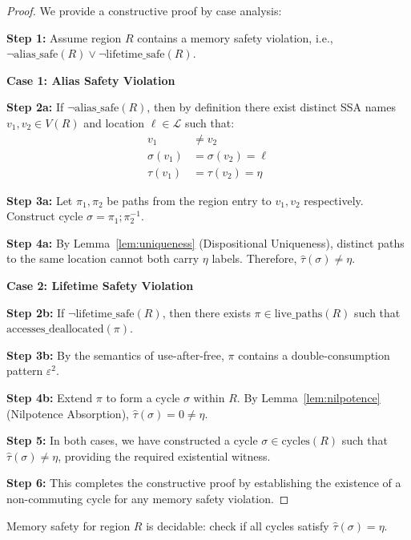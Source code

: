\documentclass[journal]{IEEEtran}
\begin{document}
\begin{proof}
We provide a constructive proof by case analysis:

\textbf{Step 1:} Assume region $R$ contains a memory safety violation, i.e., $\neg \text{alias\_safe}(R) \lor \neg \text{lifetime\_safe}(R)$.

\textbf{Case 1: Alias Safety Violation}

\textbf{Step 2a:} If $\neg \text{alias\_safe}(R)$, then by definition there exist distinct SSA names $v_1, v_2 \in V(R)$ and location $\ell \in \mathcal{L}$ such that:
\begin{align}
v_1 &\neq v_2 \\
\sigma(v_1) &= \sigma(v_2) = \ell \\
\tau(v_1) &= \tau(v_2) = \eta
\end{align}

\textbf{Step 3a:} Let $\pi_1, \pi_2$ be paths from the region entry to $v_1, v_2$ respectively. Construct cycle $\sigma = \pi_1 ; \pi_2^{-1}$.

\textbf{Step 4a:} By Lemma~\ref{lem:uniqueness} (Dispositional Uniqueness), distinct paths to the same location cannot both carry $\eta$ labels. Therefore, $\hat{\tau}(\sigma) \neq \eta$.

\textbf{Case 2: Lifetime Safety Violation}

\textbf{Step 2b:} If $\neg \text{lifetime\_safe}(R)$, then there exists $\pi \in \text{live\_paths}(R)$ such that $\text{accesses\_deallocated}(\pi)$.

\textbf{Step 3b:} By the semantics of use-after-free, $\pi$ contains a double-consumption pattern $\varepsilon^2$.

\textbf{Step 4b:} Extend $\pi$ to form a cycle $\sigma$ within $R$. By Lemma~\ref{lem:nilpotence} (Nilpotence Absorption), $\hat{\tau}(\sigma) = 0 \neq \eta$.

\textbf{Step 5:} In both cases, we have constructed a cycle $\sigma \in \text{cycles}(R)$ such that $\hat{\tau}(\sigma) \neq \eta$, providing the required existential witness.

\textbf{Step 6:} This completes the constructive proof by establishing the existence of a non-commuting cycle for any memory safety violation. 
\end{proof}

\begin{corollary}
\label{cor:decidability}
Memory safety for region $R$ is decidable: check if all cycles satisfy $\hat{\tau}(\sigma) = \eta$.
\end{corollary}
\end{document}
